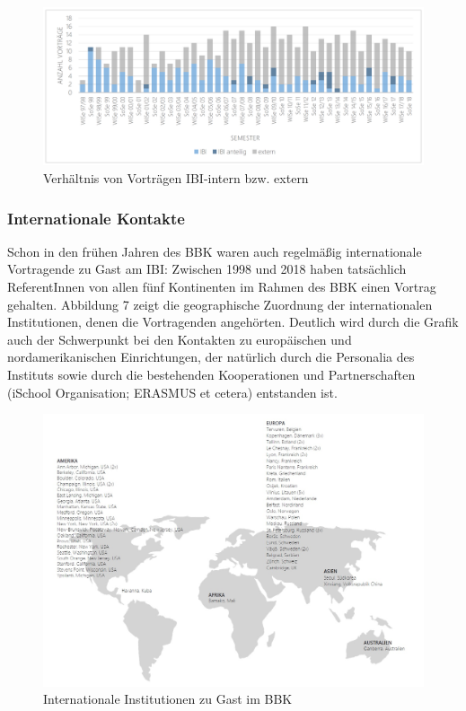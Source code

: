 \documentclass[a4paper,
fontsize=11pt,
oneside,
numbers=noperiodatend,
parskip=half-,
bibliography=totoc,
final
]{scrartcl}
\begin{document}
\begin{figure}
\centering
\includegraphics[width=16cm]{img/Abbildung6.png}
\caption{Verhältnis von Vorträgen IBI-intern bzw. extern}
\end{figure}

\hypertarget{internationale-kontakte}{%
\subsubsection{Internationale Kontakte}\label{internationale-kontakte}}

Schon in den frühen Jahren des BBK waren auch regelmäßig internationale
Vortragende zu Gast am IBI: Zwischen 1998 und 2018 haben tatsächlich
ReferentInnen von allen fünf Kontinenten im Rahmen des BBK einen Vortrag
gehalten. Abbildung 7 zeigt die geographische Zuordnung der
internationalen Institutionen, denen die Vortragenden angehörten.
Deutlich wird durch die Grafik auch der Schwerpunkt bei den Kontakten zu
europäischen und nordamerikanischen Einrichtungen, der natürlich durch
die Personalia des Instituts sowie durch die bestehenden Kooperationen
und Partnerschaften (iSchool Organisation; ERASMUS et cetera) entstanden
ist.

\begin{figure}[h!]
\centering
\includegraphics[width=15cm]{img/Abbildung7.jpg}
\caption{Internationale Institutionen zu Gast im BBK}
\end{figure}
\end{document}

